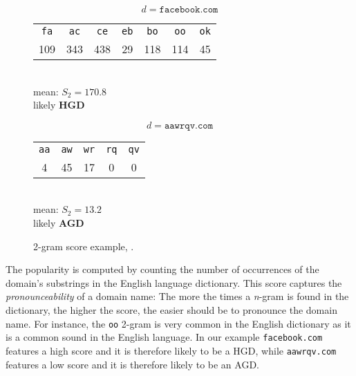 \begin{figure}[!htp]
\begin{minipage}{0.5\textwidth}
    \centering
    $$ d = \mathtt{facebook.com}$$\vspace{-0.2cm}
    \begin{scriptsize}
        \begin{tabular}{c c c c c c c}
          \texttt{fa} & \texttt{ac} & \texttt{ce} & \texttt{eb} & \texttt{bo}  & \texttt{oo}  & \texttt{ok}\\
          109 & 343 & 438 & 29 & 118 & 114 & 45
        \end{tabular}\end{scriptsize}\\
        \vspace{0.5cm}
        mean: $S_2 = 170.8$
        \vspace{0.3cm} \\ likely \textbf{HGD}
\end{minipage}%
\begin{minipage}{0.5\textwidth}
        \centering
        $$ d = \mathtt{aawrqv.com}$$\vspace{-0.2cm}
        \begin{scriptsize}
        \begin{tabular}{ c c c c c }
          \texttt{aa} & \texttt{aw} & \texttt{wr} & \texttt{rq} & \texttt{qv}\\
          4 & 45 & 17 & 0 & 0
        \end{tabular}\end{scriptsize}\\
        \vspace{0.5cm}
        mean: $S_2 = 13.2$
        \vspace{0.3cm} \\ likely \textbf{AGD}
\end{minipage}
\caption{2-gram score example, \citet{schiavoni2013}.}
\label{fig:two_gram_example}
\end{figure}

The popularity is computed by counting the number of occurrences of the domain's
substrings in the English language dictionary. This score captures the
\emph{pronounceability} of a domain name: The more the times a \emph{n}-gram
is found in the dictionary, the higher the score, the easier should be to
pronounce the domain name. For instance, the \texttt{oo} 2-gram is very common
in the English dictionary as it is a common sound in the English language.
In our example \texttt{facebook.com} features a high score and it is therefore
likely to be a HGD, while \texttt{aawrqv.com} features a low score and it is
therefore likely to be an AGD.

